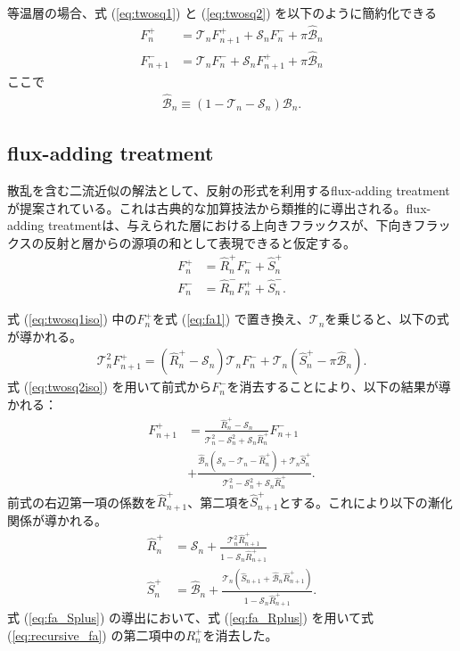 等温層の場合、式 (\ref{eq:twosq1}) と (\ref{eq:twosq2}) を以下のように簡約化できる
\begin{align}
\label{eq:twosq1iso}
 F^+_n &= \mathcal{T}_n F^+_{n+1} + \mathcal{S}_n F^-_n + \pi \hat{\mathcal{B}}_n\\
 \label{eq:twosq2iso}
 F^-_{n+1} &= \mathcal{T}_n F^-_{n} + \mathcal{S}_n F^+_{n+1} + \pi \hat{\mathcal{B}}_n
\end{align}
ここで
\begin{align}
    \hat{\mathcal{B}}_n \equiv (1 - \mathcal{T}_n - \mathcal{S}_n) \mathcal{B}_n.
\end{align}


\subsection*{flux-adding treatment}\label{ss:flux-adding}

散乱を含む二流近似の解法として、反射の形式を利用するflux-adding treatment \cite{2018JQSRT.211...78R,2023PSJ.....4...10R} が提案されている。これは古典的な加算技法から類推的に導出される。flux-adding treatmentは、与えられた層における上向きフラックスが、下向きフラックスの反射と層からの源項の和として表現できると仮定する。
\begin{align}
    \label{eq:fa1}
    F_n^+ &= \hat{R}_n^+ F_n^- + \hat{S}_n^+ \\
    \label{eq:fa2}
    F_n^- &= \hat{R}_n^- F_n^+ + \hat{S}_n^-.
\end{align}

式 (\ref{eq:twosq1iso}) 中の$F_n^+$を式 (\ref{eq:fa1}) で置き換え、$\mathcal{T}_n$を乗じると、以下の式が導かれる。
\begin{align}
    \mathcal{T}_n^2 F_{n+1}^+ = (\hat{R}_n^+ - \mathcal{S}_n) \mathcal{T}_n F_n^- + \mathcal{T}_n (\hat{S}_n^+ - \pi \hat{\mathcal{B}}_n).
\end{align}
式 (\ref{eq:twosq2iso}) を用いて前式から$F_n^-$を消去することにより、以下の結果が導かれる：
\begin{align}
    \label{eq:recursive_fa}
    F_{n+1}^+ &= \frac{\hat{R}_n^+ - \mathcal{S}_n}{  \mathcal{T}_n^2 -\mathcal{S}_n^2 +  \mathcal{S}_n \hat{R}_n^+} F_{n+1}^- \nonumber \\
    &+ \frac{\hat{\mathcal{B}}_n(\mathcal{S}_n - \mathcal{T}_n- \hat{R}_n^+ ) + \mathcal{T}_n \hat{S}_n^+}{  \mathcal{T}_n^2 -\mathcal{S}_n^2 +  \mathcal{S}_n \hat{R}_n^+}.
\end{align}
前式の右辺第一項の係数を$\hat{R}_{n+1}^+$、第二項を$\hat{S}_{n+1}^+$とする。これにより以下の漸化関係が導かれる。
\begin{align}
    \label{eq:fa_Rplus}
    \hat{R}_n^+ &= \mathcal{S}_n + \frac{\mathcal{T}_n^2 \hat{R}_{n+1}^+}{1-\mathcal{S}_n \hat{R}_{n+1}^+} \\
    \label{eq:fa_Splus}
    \hat{S}_n^+ &= \hat{\mathcal{B}}_n + \frac{\mathcal{T}_n (\hat{S}_{n+1} + \hat{\mathcal{B}}_n \hat{R}_{n+1}^+)}{1 - \mathcal{S}_n \hat{R}_{n+1}^+}.
\end{align}
式 (\ref{eq:fa_Splus}) の導出において、式 (\ref{eq:fa_Rplus}) を用いて式 (\ref{eq:recursive_fa}) の第二項中の$R_n^+$を消去した。

